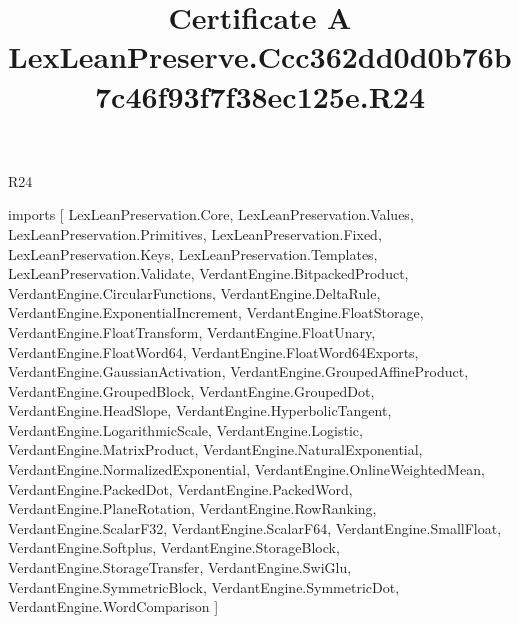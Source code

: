 \begin{lexlean}{R24}
\title{Certificate A LexLeanPreserve.Ccc362dd0d0b76b7c46f93f7f38ec125e.R24}
\begin{coremodule}
imports [
  LexLeanPreservation.Core,
  LexLeanPreservation.Values,
  LexLeanPreservation.Primitives,
  LexLeanPreservation.Fixed,
  LexLeanPreservation.Keys,
  LexLeanPreservation.Templates,
  LexLeanPreservation.Validate,
  VerdantEngine.BitpackedProduct,
  VerdantEngine.CircularFunctions,
  VerdantEngine.DeltaRule,
  VerdantEngine.ExponentialIncrement,
  VerdantEngine.FloatStorage,
  VerdantEngine.FloatTransform,
  VerdantEngine.FloatUnary,
  VerdantEngine.FloatWord64,
  VerdantEngine.FloatWord64Exports,
  VerdantEngine.GaussianActivation,
  VerdantEngine.GroupedAffineProduct,
  VerdantEngine.GroupedBlock,
  VerdantEngine.GroupedDot,
  VerdantEngine.HeadSlope,
  VerdantEngine.HyperbolicTangent,
  VerdantEngine.LogarithmicScale,
  VerdantEngine.Logistic,
  VerdantEngine.MatrixProduct,
  VerdantEngine.NaturalExponential,
  VerdantEngine.NormalizedExponential,
  VerdantEngine.OnlineWeightedMean,
  VerdantEngine.PackedDot,
  VerdantEngine.PackedWord,
  VerdantEngine.PlaneRotation,
  VerdantEngine.RowRanking,
  VerdantEngine.ScalarF32,
  VerdantEngine.ScalarF64,
  VerdantEngine.SmallFloat,
  VerdantEngine.Softplus,
  VerdantEngine.StorageBlock,
  VerdantEngine.StorageTransfer,
  VerdantEngine.SwiGlu,
  VerdantEngine.SymmetricBlock,
  VerdantEngine.SymmetricDot,
  VerdantEngine.WordComparison
]


\end{coremodule}
\end{lexlean}
